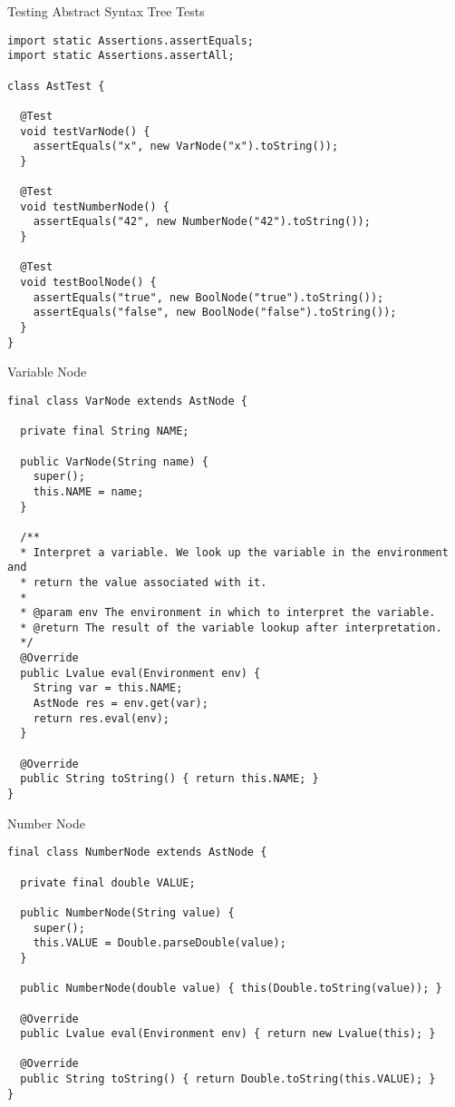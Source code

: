 \begin{cl}{Testing Abstract Syntax Tree Tests}
\begin{lstlisting}[language=MyJava]
import static Assertions.assertEquals;
import static Assertions.assertAll;

class AstTest {

  @Test
  void testVarNode() {
    assertEquals("x", new VarNode("x").toString());
  }

  @Test
  void testNumberNode() {
    assertEquals("42", new NumberNode("42").toString());
  }

  @Test
  void testBoolNode() {
    assertEquals("true", new BoolNode("true").toString());
    assertEquals("false", new BoolNode("false").toString());
  }  
}
\end{lstlisting}
\end{cl}

\begin{cl}{Variable Node}
\begin{lstlisting}[language=MyJava]
final class VarNode extends AstNode {

  private final String NAME;

  public VarNode(String name) {
    super();
    this.NAME = name;
  }

  /**
  * Interpret a variable. We look up the variable in the environment and
  * return the value associated with it.
  *
  * @param env The environment in which to interpret the variable.
  * @return The result of the variable lookup after interpretation.
  */
  @Override
  public Lvalue eval(Environment env) {
    String var = this.NAME;
    AstNode res = env.get(var);
    return res.eval(env);
  }

  @Override
  public String toString() { return this.NAME; }
}
\end{lstlisting}
\end{cl}

\begin{cl}{Number Node}
\begin{lstlisting}[language=MyJava]
final class NumberNode extends AstNode {

  private final double VALUE;

  public NumberNode(String value) {
    super();
    this.VALUE = Double.parseDouble(value);
  }

  public NumberNode(double value) { this(Double.toString(value)); }

  @Override
  public Lvalue eval(Environment env) { return new Lvalue(this); }

  @Override
  public String toString() { return Double.toString(this.VALUE); }
}
\end{lstlisting}
\end{cl}

